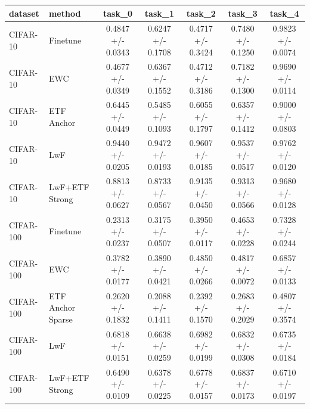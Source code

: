 \begin{tabular}{llccccc}
\hline
dataset & method & task\_0 & task\_1 & task\_2 & task\_3 & task\_4 \\
\hline
CIFAR-10 & Finetune & 0.4847 +/- 0.0343 & 0.6247 +/- 0.1708 & 0.4717 +/- 0.3424 & 0.7480 +/- 0.1250 & 0.9823 +/- 0.0074 \\
CIFAR-10 & EWC & 0.4677 +/- 0.0349 & 0.6367 +/- 0.1552 & 0.4712 +/- 0.3186 & 0.7182 +/- 0.1300 & 0.9690 +/- 0.0114 \\
CIFAR-10 & ETF Anchor & 0.6445 +/- 0.0449 & 0.5485 +/- 0.1093 & 0.6055 +/- 0.1797 & 0.6357 +/- 0.1412 & 0.9000 +/- 0.0803 \\
CIFAR-10 & LwF & 0.9440 +/- 0.0205 & 0.9472 +/- 0.0193 & 0.9607 +/- 0.0185 & 0.9537 +/- 0.0517 & 0.9762 +/- 0.0120 \\
CIFAR-10 & LwF+ETF Strong & 0.8813 +/- 0.0627 & 0.8733 +/- 0.0567 & 0.9135 +/- 0.0450 & 0.9313 +/- 0.0566 & 0.9680 +/- 0.0128 \\
CIFAR-100 & Finetune & 0.2313 +/- 0.0237 & 0.3175 +/- 0.0507 & 0.3950 +/- 0.0117 & 0.4653 +/- 0.0228 & 0.7328 +/- 0.0244 \\
CIFAR-100 & EWC & 0.3782 +/- 0.0177 & 0.3890 +/- 0.0421 & 0.4850 +/- 0.0266 & 0.4817 +/- 0.0072 & 0.6857 +/- 0.0133 \\
CIFAR-100 & ETF Anchor Sparse & 0.2620 +/- 0.1832 & 0.2088 +/- 0.1411 & 0.2392 +/- 0.1570 & 0.2683 +/- 0.2029 & 0.4807 +/- 0.3574 \\
CIFAR-100 & LwF & 0.6818 +/- 0.0151 & 0.6638 +/- 0.0259 & 0.6982 +/- 0.0199 & 0.6832 +/- 0.0308 & 0.6735 +/- 0.0184 \\
CIFAR-100 & LwF+ETF Strong & 0.6490 +/- 0.0109 & 0.6378 +/- 0.0225 & 0.6778 +/- 0.0157 & 0.6837 +/- 0.0173 & 0.6710 +/- 0.0197 \\
\hline
\end{tabular}
